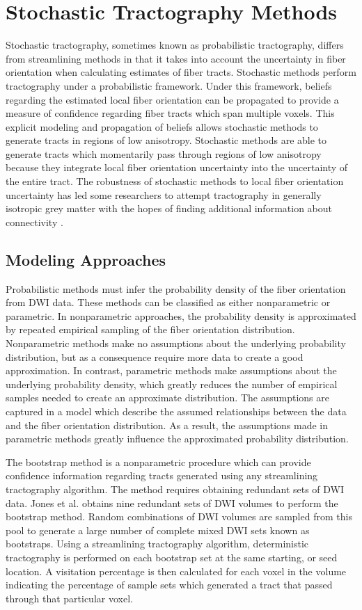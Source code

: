 \chapter{Stochastic Tractography Methods}
Stochastic tractography, sometimes known as probabilistic tractography, differs from streamlining methods in that it takes into account the uncertainty in fiber orientation when calculating estimates of fiber tracts.  Stochastic methods perform tractography under a probabilistic framework.  Under this framework, beliefs regarding the estimated local fiber orientation can be propagated to provide a measure of confidence regarding fiber tracts which span multiple voxels.  This explicit modeling and propagation of beliefs allows stochastic methods to generate tracts in regions of low anisotropy. Stochastic methods are able to generate tracts which momentarily pass through regions of low anisotropy because they integrate local fiber orientation uncertainty into the uncertainty of the entire tract.  The robustness of stochastic methods to local fiber orientation uncertainty has led some researchers to attempt tractography in generally isotropic grey matter with the hopes of finding additional information about connectivity \cite{behrensMRM03}.

\section{Modeling Approaches}
Probabilistic methods must infer the probability density of the fiber orientation from DWI data.  These methods can be classified as either nonparametric or parametric.  In nonparametric approaches, the probability density is approximated by repeated empirical sampling of the fiber orientation distribution.  Nonparametric methods make no assumptions about the underlying probability distribution, but as a consequence require more data to create a good approximation.  In contrast, parametric methods make assumptions about the underlying probability density, which greatly reduces the number of empirical samples needed to create an approximate distribution. The assumptions are captured in a model which describe the assumed relationships between the data and the fiber orientation distribution.  As a result, the assumptions made in parametric methods greatly influence the approximated probability distribution.

The bootstrap method is a nonparametric procedure which can provide confidence information regarding tracts generated using any streamlining tractography algorithm.  The method requires obtaining redundant sets of DWI data.  Jones et al. \cite{derek} obtains nine redundant sets of DWI volumes to perform the bootstrap method.  Random combinations of DWI volumes are sampled from this pool to generate a large number of complete mixed DWI sets known as bootstraps.  Using a streamlining tractography algorithm, deterministic tractography is performed on each bootstrap set at the same starting, or seed location.  A visitation percentage is then calculated for each voxel in the volume indicating the percentage of sample sets which generated a tract that passed through that particular voxel.

